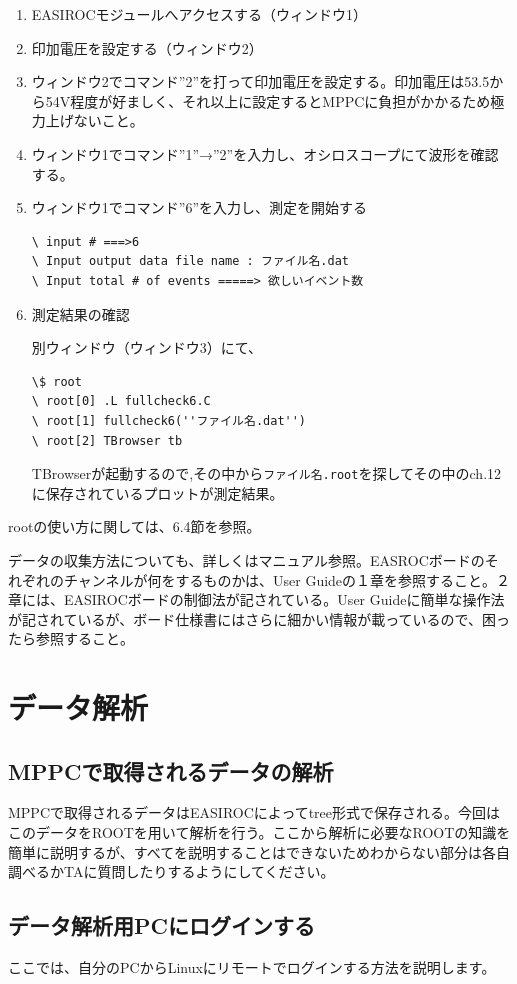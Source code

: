\documentclass[uplatex,10pt,a4j]{jsarticle}
\begin{document}
\begin{enumerate}
  \item EASIROCモジュールへアクセスする（ウィンドウ1）
  \item 印加電圧を設定する（ウィンドウ2）
  \item ウィンドウ2でコマンド''2''を打って印加電圧を設定する。印加電圧は53.5から54V程度が好ましく、それ以上に設定するとMPPCに負担がかかるため極力上げないこと。
  \item ウィンドウ1でコマンド''1''→''2''を入力し、オシロスコープにて波形を確認する。
  \item ウィンドウ1でコマンド''6''を入力し、測定を開始する\par
        \begin{lstlisting}[caption=測定手順]
\ input # ===>6
\ Input output data file name : ファイル名.dat
\ Input total # of events =====> 欲しいイベント数
\end{lstlisting}
  \item 測定結果の確認\par
        別ウィンドウ（ウィンドウ3）にて、
        \begin{lstlisting}[caption=測定結果の確認]
\$ root
\ root[0] .L fullcheck6.C
\ root[1] fullcheck6(''ファイル名.dat'')
\ root[2] TBrowser tb
\end{lstlisting}
        TBrowserが起動するので,その中から{\tt ファイル名.root}を探してその中のch.12に保存されているプロットが測定結果。
\end{enumerate}
rootの使い方に関しては、6.4節を参照。\par
データの収集方法についても、詳しくはマニュアル参照。EASROCボードのそれぞれのチャンネルが何をするものかは、User Guideの１章を参照すること。２章には、EASIROCボードの制御法が記されている。User Guideに簡単な操作法が記されているが、ボード仕様書にはさらに細かい情報が載っているので、困ったら参照すること。
\section{データ解析}
\subsection{MPPCで取得されるデータの解析}
MPPCで取得されるデータはEASIROCによってtree形式で保存される。今回はこのデータをROOTを用いて解析を行う。ここから解析に必要なROOTの知識を簡単に説明するが、すべてを説明することはできないためわからない部分は各自調べるかTAに質問したりするようにしてください。

\subsection{データ解析用PCにログインする}
ここでは、自分のPCからLinuxにリモートでログインする方法を説明します。
\end{document}
